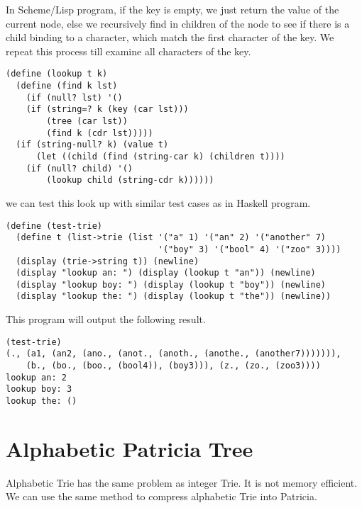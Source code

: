 \documentclass{article}
\begin{document}
In Scheme/Lisp program, if the key is empty, we just return the value
of the current node, else we recursively find in children of the node
to see if there is a child binding to a character, which match the
first character of the key. We repeat this process till examine all
characters of the key.

\lstset{language=lisp}
\begin{lstlisting}
(define (lookup t k)
  (define (find k lst)
    (if (null? lst) '()
	(if (string=? k (key (car lst)))
	    (tree (car lst))
	    (find k (cdr lst)))))
  (if (string-null? k) (value t)
      (let ((child (find (string-car k) (children t))))
	(if (null? child) '()
	    (lookup child (string-cdr k))))))
\end{lstlisting}

we can test this look up with similar test cases as in Haskell program.

\begin{lstlisting}
(define (test-trie)
  (define t (list->trie (list '("a" 1) '("an" 2) '("another" 7) 
                              '("boy" 3) '("bool" 4) '("zoo" 3))))
  (display (trie->string t)) (newline)
  (display "lookup an: ") (display (lookup t "an")) (newline)
  (display "lookup boy: ") (display (lookup t "boy")) (newline)
  (display "lookup the: ") (display (lookup t "the")) (newline))
\end{lstlisting}

This program will output the following result.

\begin{lstlisting}
(test-trie)
(., (a1, (an2, (ano., (anot., (anoth., (anothe., (another7))))))), 
    (b., (bo., (boo., (bool4)), (boy3))), (z., (zo., (zoo3))))
lookup an: 2
lookup boy: 3
lookup the: ()
\end{lstlisting}

\section{Alphabetic Patricia Tree}
Alphabetic Trie has the same problem as integer Trie. It is not memory
efficient. We can use the same method to compress alphabetic Trie into
Patricia.

\end{document}
